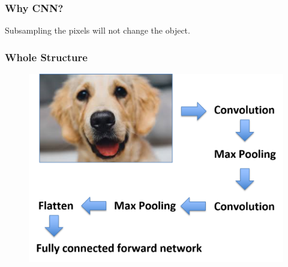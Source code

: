 \documentclass{beamer}
\begin{document}
\begin{frame}
	\frametitle{Why CNN?}
	Subsampling the pixels will not change the object.
	
	\begin{figure}
		\hfill
		\hfill
		\hfill
	\end{figure}
	
\end{frame}

\begin{frame}
	\frametitle{Whole Structure}
	\begin{figure}
	\includegraphics[width=0.8\linewidth]{Picture1}
	\end{figure}
\end{frame}
\end{document}
